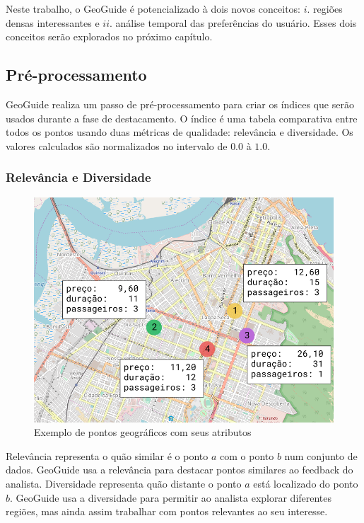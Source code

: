 Neste trabalho, o GeoGuide é potencializado à dois novos conceitos: $i$. regiões densas interessantes e $ii$. análise temporal das preferências do usuário. Esses dois conceitos serão explorados no próximo capítulo.

\subsection{Pré-processamento}

GeoGuide realiza um passo de pré-processamento para criar os índices que serão usados durante a fase de destacamento. O índice é uma tabela comparativa entre todos os pontos usando duas métricas de qualidade: relevância e diversidade. Os valores calculados são normalizados no intervalo de $0.0$ à $1.0$.

\subsubsection{Relevância e Diversidade}

\begin{figure}[t]
	\centering
	\includegraphics[width=\columnwidth]{imagens/exemplo-de-pontos}
	\caption{Exemplo de pontos geográficos com seus atributos}
	\label{fig:exemplo-pontos}
	\vspace{-10pt}
\end{figure}

Relevância representa o quão similar é o ponto $a$ com o ponto $b$ num conjunto de dados. GeoGuide usa a relevância para destacar pontos similares ao feedback do analista. Diversidade representa quão distante o ponto $a$ está localizado do ponto $b$. GeoGuide usa a diversidade para permitir ao analista explorar diferentes regiões, mas ainda assim trabalhar com pontos relevantes ao seu interesse.

